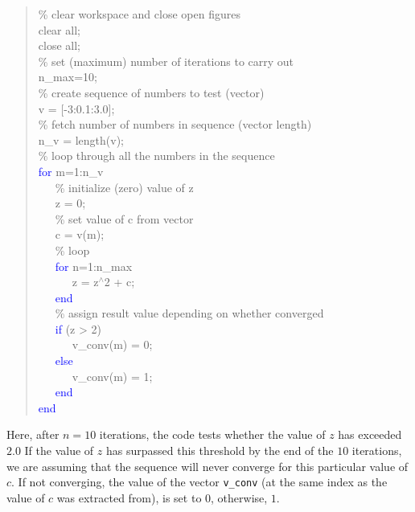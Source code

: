 \documentclass{tufte-book} %
\newenvironment{docspecmargin}{\begin{quotation}\ttfamily\footnotesize\parskip0pt\parindent0pt\ignorespaces}{\end{quotation}}
\begin{document}
\vspace{4mm}
\pagebreak

\vspace{-1mm}\begin{docspecmargin}
\textcolor[rgb]{0,0.501961,0}{\% clear workspace and close open figures\\}
clear \textcolor[rgb]{1,0,1}{all};\\
close \textcolor[rgb]{1,0,1}{all};\\
\textcolor[rgb]{0,0.501961,0}{\% set (maximum) number of iterations to carry out\\}
n\_max=10;\\
\textcolor[rgb]{0,0.501961,0}{\% create sequence of numbers to test (vector)\\}
v = [-3:0.1:3.0];\\
\textcolor[rgb]{0,0.501961,0}{\% fetch number of numbers in sequence (vector length)\\}
n\_v = length(v);\\
\textcolor[rgb]{0,0.501961,0}{\% loop through all the numbers in the sequence\\}
\textcolor{blue}{for} m=1:n\_v\\
\ \ \ \textcolor[rgb]{0,0.501961,0}{\% initialize (zero) value of z\\}
\ \ \ z = 0;\\
\ \ \ \textcolor[rgb]{0,0.501961,0}{\% set value of c from vector\\}
\ \ \ c = v(m);\\
\ \ \ \textcolor[rgb]{0,0.501961,0}{\% loop\\}
\ \ \ \textcolor{blue}{for} n=1:n\_max\\
\ \ \ \ \ \ z = z\(^{\wedge}\)2 + c;\\
\ \ \ \textcolor{blue}{end}\\
\ \ \ \textcolor[rgb]{0,0.501961,0}{\% assign result value depending on whether converged\\}
\ \ \ \textcolor{blue}{if} (z > 2)\\
\ \ \ \ \ \ v\_conv(m) = 0;\\
\ \ \ \textcolor{blue}{else}\\
\ \ \ \ \ \ v\_conv(m) = 1;\\
\ \ \ \textcolor{blue}{end}\\
\textcolor{blue}{end}
\end{docspecmargin}\vspace{-1mm}

Here, after \(n=10\) iterations, the code tests whether the value of \(z\) has exceeded \(2.0\)
 If the value of \(z\) has surpassed this threshold by the end of the \(10\) iterations, we are assuming that the sequence will never converge for this particular value of \(c\).
 If not converging, the value of the vector \texttt{v\_conv} (at the same index as the value of \(c\) was extracted from), is set to \(0\), otherwise, \(1\).
 
\end{document}
